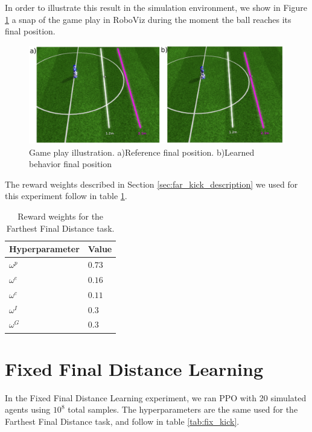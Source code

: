 In order to illustrate this result in the simulation environment, we show in Figure \ref{fig:RL_far_kick_roboviz} a snap of the game play in RoboViz during the moment the ball reaches its final position. 

\begin{figure}[H]
    \centering
    \includegraphics[width=1.0\textwidth]{Chapter7/figures/kick_far.pdf} 
    \caption{Game play illustration. a)Reference final position. b)Learned behavior final position}
    \label{fig:RL_far_kick_roboviz}
\end{figure}

The reward weights described in Section \ref{sec:far_kick_description} we used for this experiment follow in table \ref{tab:weights_far_kick}.

\begin{table}[ht]
    \begin{tabular}{|l|l|}
    \hline
    Hyperparameter            & Value    \\ \hline
    $\omega^p$ 	              & $0.73$ \\
    $\omega^e$                  & $0.16$     \\
    $\omega^c$                & $0.11$     \\
    $\omega^I$					&	$0.3$  	\\
    $\omega^G$					& 	$0.3$		\\
    \hline
    \end{tabular}
\centering
\caption{Reward weights for the Farthest Final Distance task.}
\label{tab:weights_far_kick}
\end{table}

\section{Fixed Final Distance Learning}

In the Fixed Final Distance Learning experiment, we ran PPO with 20 simulated agents using $10^8$ total samples. The hyperparameters are the same used for the Farthest Final Distance task, and follow in table \ref{tab:fix_kick}.

